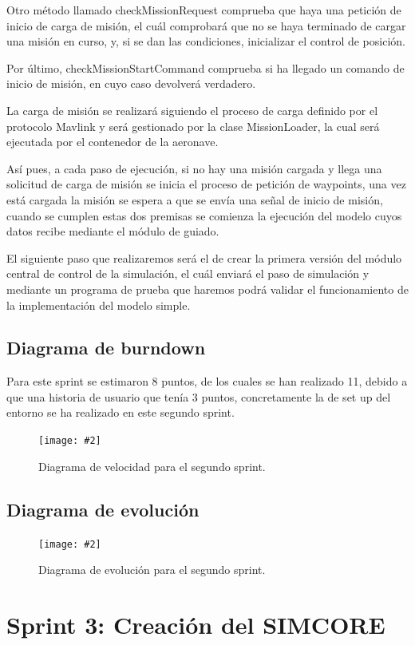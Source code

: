 \documentclass[12pt,a4paper,spanish]{book} %
\newcommand{\imgCentradaGrande}[3]{
\begin{figure}[H]
\begin{center}
\texttt{[image: \#2]}
\caption{#3}
\label{#1}
\end{center}
\end{figure}
}
\begin{document}
Otro método llamado checkMissionRequest comprueba que haya una petición de inicio de carga de misión, el cuál comprobará que no se haya terminado de cargar una misión en curso, y, si se dan las condiciones, inicializar el control de posición.

Por último, checkMissionStartCommand comprueba si ha llegado un comando de inicio de misión, en cuyo caso devolverá verdadero.

La carga de misión se realizará siguiendo el proceso de carga definido por el protocolo Mavlink y será gestionado por la clase MissionLoader, la cual será ejecutada por el contenedor de la aeronave.

Así pues, a cada paso de ejecución, si no hay una misión cargada y llega una solicitud de carga de misión se inicia el proceso de petición de waypoints, una vez está cargada la misión se espera a que se envía una señal de inicio de misión, cuando se cumplen estas dos premisas se comienza la ejecución del modelo cuyos datos recibe mediante el módulo de guiado.

El siguiente paso que realizaremos será el de crear la primera versión del módulo central de control de la simulación, el cuál enviará el paso de simulación y mediante un programa de prueba que haremos podrá validar el funcionamiento de la implementación del modelo simple.

\newpage
\subsection{Diagrama de burndown}

Para este sprint se estimaron 8 puntos, de los cuales se han realizado 11, debido a que una historia de usuario que tenía 3 puntos, concretamente la de set up del entorno se ha realizado en este segundo sprint.

\imgCentradaGrande{fig.4.11}{img/diagvelocidad2.eps}{Diagrama de velocidad para el segundo sprint.}

\newpage
\subsection{Diagrama de evolución}
\imgCentradaGrande{fig.4.12}{img/diagevolucion2.eps}{Diagrama de evolución para el segundo sprint.}

\newpage
\section{Sprint 3: Creación del SIMCORE}
\end{document}
